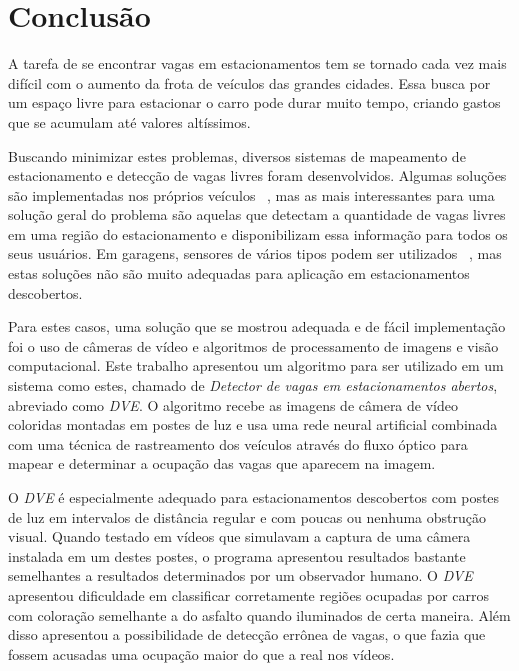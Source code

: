 \chapter{Conclusão}\label{cap:conclusao}

A tarefa de se encontrar vagas em estacionamentos tem se tornado cada vez mais difícil com o aumento da frota de veículos das grandes cidades. Essa busca por um espaço livre para estacionar o carro pode durar muito tempo, criando gastos que se acumulam até valores altíssimos.

Buscando minimizar estes problemas, diversos sistemas de mapeamento de estacionamento e detecção de vagas livres foram desenvolvidos. Algumas soluções são implementadas nos próprios veículos ~\cite{schmid2011parking}, mas as mais interessantes para uma solução geral do problema são aquelas que detectam a quantidade de vagas livres em uma região do estacionamento e disponibilizam essa informação para todos os seus usuários. Em garagens, sensores de vários tipos podem ser utilizados ~\cite{kianpisheh2012smart,lee2008intelligent,wolff2006parking}, mas estas soluções não são muito adequadas para aplicação em estacionamentos descobertos. 

Para estes casos, uma solução que se mostrou adequada e de fácil implementação foi o uso de câmeras de vídeo e algoritmos de processamento de imagens e visão computacional. Este trabalho apresentou um algoritmo para ser utilizado em um sistema como estes, chamado de \textit{Detector de vagas em estacionamentos abertos}, abreviado como \textit{DVE}. O algoritmo recebe as imagens de câmera de vídeo coloridas montadas em postes de luz e usa uma rede neural artificial combinada com uma técnica de rastreamento dos veículos através do fluxo óptico para mapear e determinar a ocupação das vagas que aparecem na imagem.

O \textit{DVE} é especialmente adequado para estacionamentos descobertos com postes de luz em intervalos de distância regular e com poucas ou nenhuma obstrução visual. Quando testado em vídeos que simulavam a captura de uma câmera instalada em um destes postes, o programa apresentou resultados bastante semelhantes a resultados determinados por um observador humano. O \textit{DVE} apresentou dificuldade em classificar corretamente regiões ocupadas por carros com coloração semelhante a do asfalto quando iluminados de certa maneira. Além disso apresentou a possibilidade de detecção errônea de vagas, o que fazia que fossem acusadas uma ocupação maior do que a real nos vídeos.

